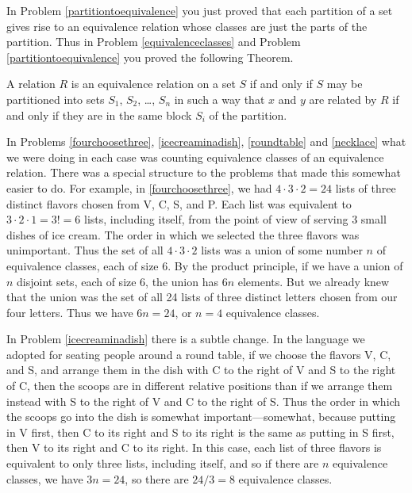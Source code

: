 In Problem \ref{partitiontoequivalence} you just proved that
each partition of a set gives rise to an equivalence relation
whose classes are just the parts of the partition.  Thus in
Problem
\ref{equivalenceclasses} and Problem
\ref{partitiontoequivalence} you proved the following Theorem.

\begin{theorem} A relation $R$ is an equivalence relation on a
set $S$ if and only if
$S$ may be partitioned into sets $S_1$, $S_2$, \ldots, $S_n$
in such a way that $x$ and $y$ are related by $R$ if and only
if they are in the same block $S_i$ of the partition.
\end{theorem}


In Problems \ref{fourchoosethree}, \ref{icecreaminadish},
\ref{roundtable} and \ref{necklace} what we were doing in
each case was counting equivalence classes of an equivalence
relation.  There was a special structure to the problems that
made this somewhat easier to do.  For example, in
\ref{fourchoosethree}, we had $4\cdot3\cdot2 =24 $ lists of
three distinct flavors chosen from V, C, S, and P.  Each list
was equivalent to  $3\cdot2\cdot1=3!=6$ lists, including
itself, from the point of view of serving 3 small dishes of
ice cream.  The order in which we selected the three flavors
was unimportant.  Thus the set of all
$4\cdot3\cdot2$ lists was a union of some number $n$ of
equivalence classes, each of size 6.  By the product
principle, if we have a union of $n$ disjoint sets, each of
size 6, the union has $6n$ elements.  But we already knew that
the union was the set of all 24 lists of three distinct
letters chosen from our four letters.  Thus we have $6n=24$,
or
$n=4$ equivalence classes.

In Problem \ref{icecreaminadish} there is a subtle change.  In
the language we adopted for seating people around a round
table, if we choose the flavors V, C, and S, and arrange them
in the dish with C to the right of V and S to the right of C,
then the scoops are in different relative positions than if we
arrange them instead with S to the right of V and C to the
right of S.  Thus the order in which the scoops go into the
dish is somewhat important---somewhat, because putting in V
first, then C to its right and S to its right is the same as
putting in S first, then V to its right and C to its right. 
In this case, each list of three flavors is equivalent to
only three lists, including itself, and so if there are
$n$ equivalence classes, we have $3n=24$, so there are $24/3=8$
equivalence classes.

